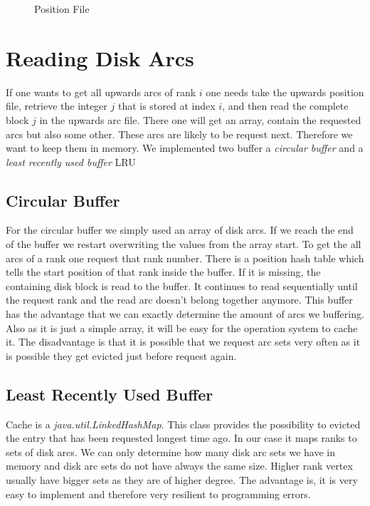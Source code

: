 \begin{figure}
    \centering
    
    \caption{Position File}
    \label{fig:position_file}
\end{figure}

\section{Reading Disk Arcs}

If one wants to get all upwards arcs of rank $i$ one needs take  the upwards position file, retrieve the integer $j$ that is stored at index $i$, and then read the complete block $j$ in the upwards arc file. 
There one will get an array, contain the requested arcs but also some other. These arcs are likely to be request next. Therefore we want to keep them in memory. We implemented two buffer a \textit{circular buffer} and a \textit{least recently used buffer} LRU

\subsection{Circular Buffer}

For the circular buffer we simply used an array of disk arcs. If we reach the end of the buffer we restart overwriting the values from the array start. To get the all arcs of a rank one request that rank number. There is a position hash table which tells the start position of that rank inside the buffer. If it is missing, the containing disk block is read to the buffer. It 
continues to read sequentially until the request rank and the read arc doesn't belong together anymore. This buffer has the advantage that we can exactly determine the amount of arcs we buffering. Also as it is just a simple array, it will be easy for the operation system to cache it.
The disadvantage is that it is possible that we request arc sets very often as it is possible they get evicted just before request again.

\subsection{Least Recently Used Buffer}

Cache is a \textit{java.util.LinkedHashMap}. This class provides the possibility to evicted the entry that has been requested longest time ago. In our case it maps ranks to sets of disk arcs. We can only determine how many 
disk arc sets we have in memory and disk arc sets do not have always the same size. Higher rank vertex usually have bigger sets as they are of higher degree. The advantage is, it is very easy to implement and therefore very 
resilient to programming errors.


